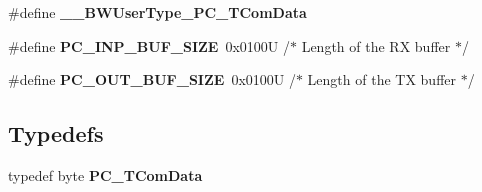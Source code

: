 \begin{DoxyCompactItemize}
\item 
\hypertarget{group___p_c__module_ga839c1b054d6216f383e06ce5fe14f056}{\#define {\bfseries \-\_\-\-\_\-\-B\-W\-User\-Type\-\_\-\-P\-C\-\_\-\-T\-Com\-Data}}\label{group___p_c__module_ga839c1b054d6216f383e06ce5fe14f056}

\item 
\hypertarget{group___p_c__module_gab703d1452f15e8aca607209d953fa066}{\#define {\bfseries P\-C\-\_\-\-I\-N\-P\-\_\-\-B\-U\-F\-\_\-\-S\-I\-Z\-E}~0x0100\-U       /$\ast$ Length of the R\-X buffer $\ast$/}\label{group___p_c__module_gab703d1452f15e8aca607209d953fa066}

\item 
\hypertarget{group___p_c__module_ga82030a3de89b3292915ea6dc6a26fb7f}{\#define {\bfseries P\-C\-\_\-\-O\-U\-T\-\_\-\-B\-U\-F\-\_\-\-S\-I\-Z\-E}~0x0100\-U       /$\ast$ Length of the T\-X buffer $\ast$/}\label{group___p_c__module_ga82030a3de89b3292915ea6dc6a26fb7f}

\end{DoxyCompactItemize}
\subsection*{Typedefs}
\begin{DoxyCompactItemize}
\item 
\hypertarget{group___p_c__module_gaf208785c5e4963a4e3710a41b37f8924}{typedef byte {\bfseries P\-C\-\_\-\-T\-Com\-Data}}\label{group___p_c__module_gaf208785c5e4963a4e3710a41b37f8924}

\end{DoxyCompactItemize}
